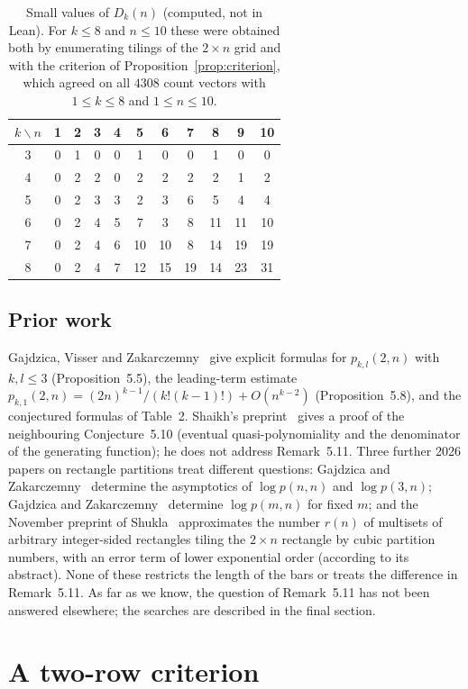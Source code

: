 \documentclass[11pt]{article}
\theoremstyle{definition}
\theoremstyle{remark}
\begin{document}
\begin{table}[ht]
\centering\small
\begin{tabular}{c|cccccccccc}
$k\backslash n$ & 1&2&3&4&5&6&7&8&9&10\\ \hline
3 &0&1&0&0&1&0&0&1&0&0\\
4 &0&2&2&0&2&2&2&2&1&2\\
5 &0&2&3&3&2&3&6&5&4&4\\
6 &0&2&4&5&7&3&8&11&11&10\\
7 &0&2&4&6&10&10&8&14&19&19\\
8 &0&2&4&7&12&15&19&14&23&31
\end{tabular}
\caption{Small values of $D_k(n)$ (computed, not in Lean). For $k\le8$ and
$n\le10$ these were obtained both by enumerating tilings of the $2\times n$
grid and with the criterion of Proposition~\ref{prop:criterion}, which agreed
on all $4308$ count vectors with $1\le k\le8$ and $1\le n\le10$.}
\label{tab:small}
\end{table}

\subsection*{Prior work}
Gajdzica, Visser and Zakarczemny~\cite{gvz} give explicit formulas for
$p_{k,l}(2,n)$ with $k,l\le3$ (Proposition~5.5), the leading-term estimate
$p_{k,1}(2,n)=(2n)^{k-1}/(k!(k-1)!)+O(n^{k-2})$ (Proposition~5.8), and the
conjectured formulas of Table~2. Shaikh's preprint~\cite{shaikh} gives a proof of the neighbouring
Conjecture~5.10 (eventual quasi-polynomiality and the denominator of the
generating function); he does not address Remark~5.11. Three further 2026
papers on rectangle partitions treat different questions: Gajdzica and
Zakarczemny~\cite{gz1} determine the asymptotics of $\log p(n,n)$ and
$\log p(3,n)$; Gajdzica and Zakarczemny~\cite{gz2} determine
$\log p(m,n)$ for fixed $m$; and the November preprint of
Shukla~\cite{shukla} approximates the number $r(n)$ of multisets of arbitrary
integer-sided rectangles tiling the $2\times n$ rectangle by cubic partition
numbers, with an error term of lower exponential order (according to its abstract). None of these restricts the length of the bars or treats the
difference in Remark~5.11. As far as we know, the question of Remark~5.11 has
not been answered elsewhere; the searches are described in the final section.

\section{A two-row criterion}\label{sec:criterion}
\end{document}
